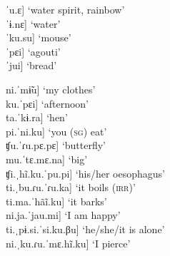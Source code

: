 \ea\label{ex:Sketch-Troch}
\ea\label{ex:Sketch-Troch.1}  
\tab   {[}ˈu.ɛ] \tab\tab ‘water spirit, rainbow’\\
  \tab  {[}ˈɨ.nɛ] \tab\tab ‘water’\\
  \tab {[}ˈku.su] \tab ‘mouse’\\
\ex\label{ex:Sketch-Troch.2} \tab   {[}ˈpɛi] \tab\tab ‘agouti’\\
  \tab  {[}ˈjui] \tab\tab ‘bread’\\
  \z
\xe




\ea\label{ex:Sketch-Iamb}
\ea\label{ex:Sketch-Iamb.1} 
\tab     {[}ni.ˈmɨ̃u] \tab\tab\tab ‘my clothes’\\
 \tab    {[}ku.ˈpɛi] \tab\tab\tab ‘afternoon’\\
\ex\label{ex:Sketch-Iamb.2} 
\tab     {[}ta.ˈkɨ.ra] \tab\tab\tab  ‘hen’ \\
 \tab      {[}pi.ˈni.ku] \tab\tab\tab  ‘you (\textsc{sg}) eat’\\
\ex\label{ex:Sketch-Iamb.3} 
\tab     {[}ʧu.ˈɾu.pɛ.pɛ] \tab\tab ‘butterfly’\\
 \tab     {[}mu.ˈtɛ.mɛ.na] \tab\tab ‘big’\\
 \ex\label{ex:Sketch-Iamb.4} 
 \tab     {[}ʧi.ˌhĩ.ku.ˈpu.pi] \tab\tab ‘his/her oesophagus’\\
 \tab      {[}ti.ˌbu.ɾu.ˈɾu.ka]  \tab\tab ‘it boils (\textsc{irr})’\\
 \ex\label{ex:Sketch-Iamb.5} 
 \tab      {[}ti.ma.ˈhãĩ.ku] \tab\tab ‘it barks’\\
 \tab   {[}ni.ja.ˈjau.mi] \tab\tab ‘I am happy’\\
 \ex\label{ex:Sketch-Iamb.6} 
 \tab     {[}ti.ˌpɨ.si.ˈsi.ku.βu] \tab\tab   ‘he/she/it is alone’\\
 \tab  {[}ni.ˌku.ɾu.ˈmɛ.hĩ.ku] \tab  ‘I pierce’\\
 \z
    \xe   
    
